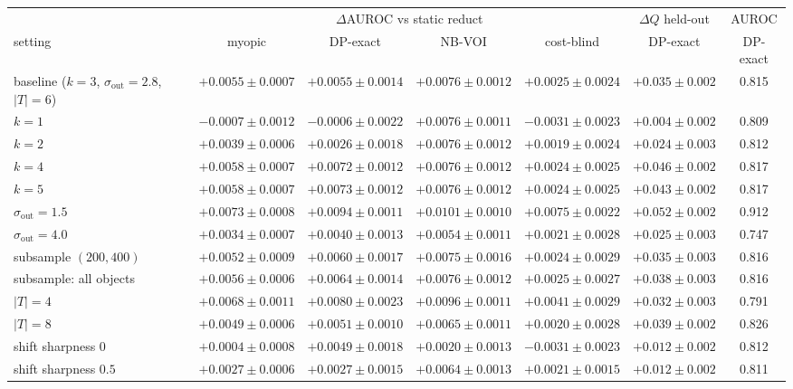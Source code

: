 \begin{tabular}{lcccccc}
\toprule
& \multicolumn{4}{c}{$\Delta$AUROC vs static reduct} & $\Delta Q$ held-out & AUROC \\
\cmidrule(lr){2-5}
setting & myopic & DP-exact & NB-VOI & cost-blind & DP-exact & DP-exact \\
\midrule
baseline ($k=3$, $\sigma_{\mathrm{out}}=2.8$, $|T|=6$) & $+0.0055\pm0.0007$ & $+0.0055\pm0.0014$ & $+0.0076\pm0.0012$ & $+0.0025\pm0.0024$ & $+0.035\pm0.002$ & 0.815 \\
$k=1$ & $-0.0007\pm0.0012$ & $-0.0006\pm0.0022$ & $+0.0076\pm0.0011$ & $-0.0031\pm0.0023$ & $+0.004\pm0.002$ & 0.809 \\
$k=2$ & $+0.0039\pm0.0006$ & $+0.0026\pm0.0018$ & $+0.0076\pm0.0012$ & $+0.0019\pm0.0024$ & $+0.024\pm0.003$ & 0.812 \\
$k=4$ & $+0.0058\pm0.0007$ & $+0.0072\pm0.0012$ & $+0.0076\pm0.0012$ & $+0.0024\pm0.0025$ & $+0.046\pm0.002$ & 0.817 \\
$k=5$ & $+0.0058\pm0.0007$ & $+0.0073\pm0.0012$ & $+0.0076\pm0.0012$ & $+0.0024\pm0.0025$ & $+0.043\pm0.002$ & 0.817 \\
$\sigma_{\mathrm{out}}=1.5$ & $+0.0073\pm0.0008$ & $+0.0094\pm0.0011$ & $+0.0101\pm0.0010$ & $+0.0075\pm0.0022$ & $+0.052\pm0.002$ & 0.912 \\
$\sigma_{\mathrm{out}}=4.0$ & $+0.0034\pm0.0007$ & $+0.0040\pm0.0013$ & $+0.0054\pm0.0011$ & $+0.0021\pm0.0028$ & $+0.025\pm0.003$ & 0.747 \\
subsample $(200,400)$ & $+0.0052\pm0.0009$ & $+0.0060\pm0.0017$ & $+0.0075\pm0.0016$ & $+0.0024\pm0.0029$ & $+0.035\pm0.003$ & 0.816 \\
subsample: all objects & $+0.0056\pm0.0006$ & $+0.0064\pm0.0014$ & $+0.0076\pm0.0012$ & $+0.0025\pm0.0027$ & $+0.038\pm0.003$ & 0.816 \\
$|T|=4$ & $+0.0068\pm0.0011$ & $+0.0080\pm0.0023$ & $+0.0096\pm0.0011$ & $+0.0041\pm0.0029$ & $+0.032\pm0.003$ & 0.791 \\
$|T|=8$ & $+0.0049\pm0.0006$ & $+0.0051\pm0.0010$ & $+0.0065\pm0.0011$ & $+0.0020\pm0.0028$ & $+0.039\pm0.002$ & 0.826 \\
shift sharpness $0$ & $+0.0004\pm0.0008$ & $+0.0049\pm0.0018$ & $+0.0020\pm0.0013$ & $-0.0031\pm0.0023$ & $+0.012\pm0.002$ & 0.812 \\
shift sharpness $0.5$ & $+0.0027\pm0.0006$ & $+0.0027\pm0.0015$ & $+0.0064\pm0.0013$ & $+0.0021\pm0.0015$ & $+0.012\pm0.002$ & 0.811 \\
\bottomrule
\end{tabular}